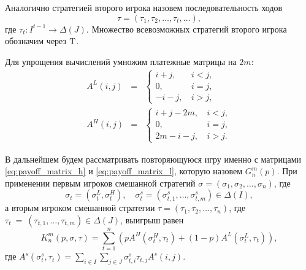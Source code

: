 Аналогично стратегией второго игрока назовем последовательность ходов
\[
  \tau = (\tau_1, \tau_2, \ldots, \tau_t, \ldots),
\]
где $ \tau_t: I^{t-1} \rightarrow \Delta(J) $. Множество всевозможных стратегий второго игрока обозначим через $ \mathrm{T} $.

Для упрощения вычислений умножим платежные матрицы на $ 2m $:
\begin{eqnarray}
\label{eq:payoff_matrix_h}
A^L(i, j) &=& \begin{cases}
  i + j, &\, i < j, \\
  0, &\, i = j, \\
  -i - j, &\, i > j,
\end{cases}
\\
\label{eq:payoff_matrix_l}
A^H(i, j) &=& \begin{cases}
  i + j - 2m, &\, i < j, \\
  0, &\, i = j, \\
  2m - i - j, &\, i > j.
\end{cases}
\end{eqnarray}

В дальнейшем будем рассматривать повторяющуюся игру именно с матрицами \eqref{eq:payoff_matrix_h} и \eqref{eq:payoff_matrix_l}, которую назовем $ G_n^m(p) $. При применении первым игроков смешанной стратегий 
$ \sigma = (\sigma_1, \sigma_2, \ldots, \sigma_n) $, где 
\[ 
  \sigma_t = (\sigma_t^L, \sigma_t^H), \quad
  \sigma^s_t = (\sigma^s_{t, 1}, \ldots, \sigma^s_{t, m}) \in \Delta(I),
\] 
а вторым игроком смешанной стратегии 
$ \tau = (\tau_1, \tau_2, \ldots, \tau_n) $, где
$ \tau_t~=~(\tau_{t, 1}, \ldots, \tau_{t, m}) \in \Delta(J) $,
выигрыш равен
\begin{equation}
\label{eq:value_of_game_n}
K_n^m(p, \sigma, \tau) = \sum_{t=1}^n
    \left(
        pA^H(\sigma_t^H, \tau_t) + (1 - p)A^L(\sigma_t^L, \tau_t)
    \right),
\end{equation}
где 
$ 
  A^s(\sigma^s_t,\tau_t) = 
    \sum_{i \in I}
      \sum_{j \in J}
        \sigma^s_{t, i} \tau_{t, j} A^s(i, j).
$